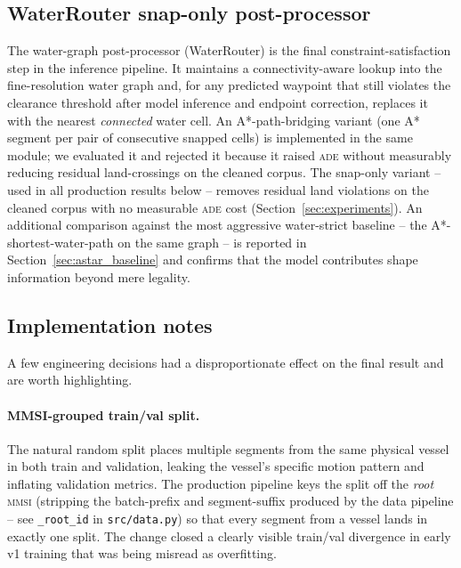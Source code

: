 \documentclass[oneside, a4paper, onecolumn, 11pt]{article}
\newcommand{\ade}{\textsc{ade}}
\begin{document}
\subsection{WaterRouter snap-only post-processor}

The water-graph post-processor (WaterRouter) is the final
constraint-satisfaction step in the inference pipeline.  It maintains
a connectivity-aware lookup into the fine-resolution water graph and,
for any predicted waypoint that still violates the clearance
threshold after model inference and endpoint correction, replaces it
with the nearest \emph{connected} water cell.  An A*-path-bridging
variant (one A* segment per pair of consecutive snapped cells) is
implemented in the same module; we evaluated it and rejected it
because it raised \ade{} without measurably reducing residual
land-crossings on the cleaned corpus.  The snap-only variant -- used
in all production results below -- removes residual land violations
on the cleaned corpus with no measurable \ade{} cost
(Section~\ref{sec:experiments}).  An additional comparison against
the most aggressive water-strict baseline -- the A*-shortest-water-path
on the same graph -- is reported in Section~\ref{sec:astar_baseline}
and confirms that the model contributes shape information beyond mere
legality.

\subsection{Implementation notes}

A few engineering decisions had a disproportionate effect on the final
result and are worth highlighting.

\paragraph{MMSI-grouped train/val split.}
The natural random split places multiple segments from the same
physical vessel in both train and validation, leaking the vessel's
specific motion pattern and inflating validation metrics.  The
production pipeline keys the split off the \emph{root} \textsc{mmsi}
(stripping the batch-prefix and segment-suffix produced by the data
pipeline -- see \texttt{\_root\_id} in \texttt{src/data.py}) so that
every segment from a vessel lands in exactly one split.  The change
closed a clearly visible train/val divergence in early v1 training
that was being misread as overfitting.
\end{document}
